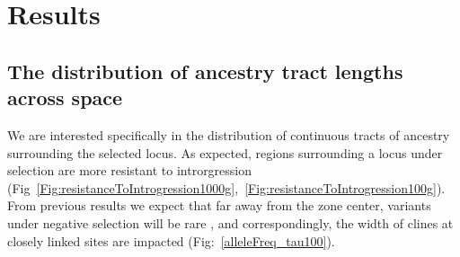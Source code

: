 \documentclass[12pt]{article}
\begin{document}

\section{Results}
\subsection*{The distribution of ancestry tract lengths across space}
We are interested specifically in the distribution of continuous tracts of ancestry surrounding the selected locus. As expected, regions surrounding a locus under selection are more resistant to introrgression (Fig~\ref{Fig:resistanceToIntrogression1000g},~\ref{Fig:resistanceToIntrogression100g}). From previous results we expect that far away from the zone center, variants under negative selection will be rare \citep[for demonstration of this theoretical result, see e.g.][]{May1975,Slatkin1973,Barton??}, and correspondingly, the width of clines at closely linked sites are impacted (Fig:~\ref{alleleFreq_tau100}). 
\end{document}
